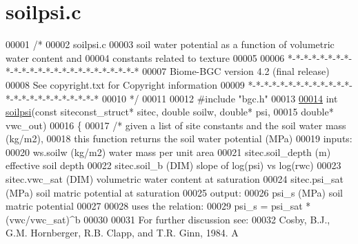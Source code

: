 \hypertarget{soilpsi_8c_source}{}\section{soilpsi.\+c}
\label{soilpsi_8c_source}

\begin{DoxyCode}
00001 \textcolor{comment}{/* }
00002 \textcolor{comment}{soilpsi.c}
00003 \textcolor{comment}{soil water potential as a function of volumetric water content and}
00004 \textcolor{comment}{constants related to texture}
00005 \textcolor{comment}{}
00006 \textcolor{comment}{*-*-*-*-*-*-*-*-*-*-*-*-*-*-*-*-*-*-*-*-*-*-*-*-*}
00007 \textcolor{comment}{Biome-BGC version 4.2 (final release)}
00008 \textcolor{comment}{See copyright.txt for Copyright information}
00009 \textcolor{comment}{*-*-*-*-*-*-*-*-*-*-*-*-*-*-*-*-*-*-*-*-*-*-*-*-*}
00010 \textcolor{comment}{*/}
00011 
00012 \textcolor{preprocessor}{#include "bgc.h"}
00013 
\hypertarget{soilpsi_8c_source_l00014}{}\hyperlink{soilpsi_8c_a16f73418658201a227e8ad4bf8e575ab}{00014} \textcolor{keywordtype}{int} \hyperlink{soilpsi_8c_a16f73418658201a227e8ad4bf8e575ab}{soilpsi}(\textcolor{keyword}{const} siteconst\_struct* sitec, \textcolor{keywordtype}{double} soilw, \textcolor{keywordtype}{double}* psi,
00015 \textcolor{keywordtype}{double}* vwc\_out)
00016 \{
00017     \textcolor{comment}{/* given a list of site constants and the soil water mass (kg/m2),}
00018 \textcolor{comment}{    this function returns the soil water potential (MPa)}
00019 \textcolor{comment}{    inputs:}
00020 \textcolor{comment}{    ws.soilw           (kg/m2) water mass per unit area}
00021 \textcolor{comment}{    sitec.soil\_depth   (m)     effective soil depth               }
00022 \textcolor{comment}{    sitec.soil\_b       (DIM)   slope of log(psi) vs log(rwc)}
00023 \textcolor{comment}{    sitec.vwc\_sat      (DIM)   volumetric water content at saturation}
00024 \textcolor{comment}{    sitec.psi\_sat      (MPa)   soil matric potential at saturation}
00025 \textcolor{comment}{    output:}
00026 \textcolor{comment}{    psi\_s              (MPa)   soil matric potential}
00027 \textcolor{comment}{}
00028 \textcolor{comment}{    uses the relation:}
00029 \textcolor{comment}{    psi\_s = psi\_sat * (vwc/vwc\_sat)^b}
00030 \textcolor{comment}{}
00031 \textcolor{comment}{    For further discussion see:}
00032 \textcolor{comment}{    Cosby, B.J., G.M. Hornberger, R.B. Clapp, and T.R. Ginn, 1984.  A     }

\end{DoxyCode}
